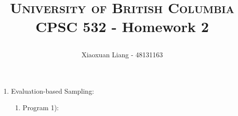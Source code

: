 \documentclass{article}
\title{ \normalfont \normalsize 

\textsc{University of British Columbia}
\horrule{0.9pt} \\[0.6cm]
\huge CPSC 532 - Homework 2}
\date{}
\author{Xiaoxuan Liang - 48131163}
\begin{document}
\maketitle

\begin{enumerate}
\item Evaluation-based Sampling:
\begin{enumerate}
\item Program 1):
\end{enumerate}
\end{enumerate}
\end{document}

